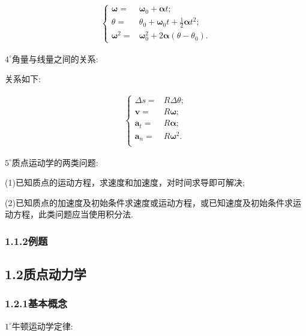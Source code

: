 \documentclass[UTF8]{ctexart}
\begin{document}
\begin{flushleft}
	\begin{equation*}
		\begin{aligned}
				\left\{
				\begin{split}
			{\boldsymbol\omega}=&{\boldsymbol\omega}_0+{\boldsymbol\alpha}t;\\
			\theta=&\theta_0+{\boldsymbol\omega}_0t+\frac{1}{2}{\boldsymbol\alpha}t^2;\\
			{\boldsymbol\omega}^2=&{\boldsymbol\omega}^2_0+2{\boldsymbol\alpha}(\theta-\theta_0).
				\end{split}
				\right.
		\end{aligned}
		\end{equation*}

	$4^{\circ}$角量与线量之间的关系:
	
	关系如下:

	\begin{equation*}
		\begin{aligned}
				\left\{
				\begin{split}
					\Delta s=&R\Delta \theta;\\
			{\boldsymbol v}=&R{\boldsymbol\omega};\\
			{\boldsymbol a}_t=&R{\boldsymbol\alpha};\\
			{\boldsymbol a}_n=&R{\boldsymbol\omega}^2.\\
				\end{split}
				\right.
		\end{aligned}
		\end{equation*}

	$5^{\circ}$质点运动学的两类问题:

	(1)已知质点的运动方程，求速度和加速度，对时间求导即可解决;

	(2)已知质点的加速度及初始条件求速度或运动方程，或已知速度及初始条件求运动方程，此类问题应当使用积分法.
	\subsubsection*{1.1.2例题}


\end{flushleft}

	\subsection*{1.2质点动力学}
	\subsubsection*{1.2.1基本概念}
	$1^{\circ}$牛顿运动学定律:
	
\end{document}
